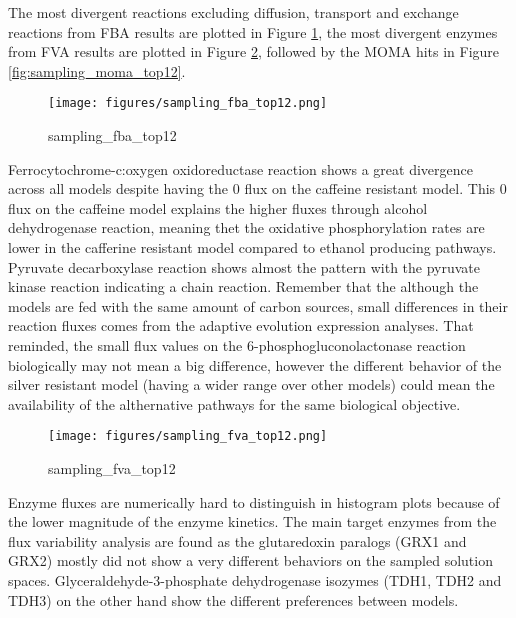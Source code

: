 The most divergent reactions excluding diffusion, transport and exchange reactions from FBA results are plotted in Figure \ref{fig:sampling_fba_top12}, the most divergent enzymes from FVA results are plotted in Figure \ref{fig:sampling_fva_top12}, followed by the MOMA hits in Figure \ref{fig:sampling_moma_top12}.

\begin{figure}[H]
  \begin{center}
  \texttt{[image: figures/sampling\_fba\_top12.png]}
  \caption[sampling_fba_top12]{sampling_fba_top12}
  \label{fig:sampling_fba_top12}
  \end{center}
\end{figure}

Ferrocytochrome-c:oxygen oxidoreductase reaction shows a great divergence across all models despite having the 0 flux on the caffeine resistant model. This 0 flux on the caffeine model explains the higher fluxes through alcohol dehydrogenase reaction, meaning thet the oxidative phosphorylation rates are lower in the cafferine resistant model compared to ethanol producing pathways. Pyruvate decarboxylase reaction shows almost the pattern with the pyruvate kinase reaction indicating a chain reaction. Remember that the although the models are fed with the same amount of carbon sources, small differences in their reaction fluxes comes from the adaptive evolution expression analyses. That reminded, the small flux values on the 6-phosphogluconolactonase reaction biologically may not mean a big difference, however the different behavior of the silver resistant model (having a wider range over other models) could mean the availability of the althernative pathways for the same biological objective.


\begin{figure}[H]
  \begin{center}
  \texttt{[image: figures/sampling\_fva\_top12.png]}
  \caption[sampling_fva_top12]{sampling_fva_top12}
  \label{fig:sampling_fva_top12}
  \end{center}
\end{figure}

Enzyme fluxes are numerically hard to distinguish in histogram plots because of the lower magnitude of the enzyme kinetics. The main target enzymes from the flux variability analysis are found as the glutaredoxin paralogs (GRX1 and GRX2) mostly did not show a very different behaviors on the sampled solution spaces. Glyceraldehyde-3-phosphate dehydrogenase isozymes (TDH1, TDH2 and TDH3) on the other hand show the different preferences between models.

